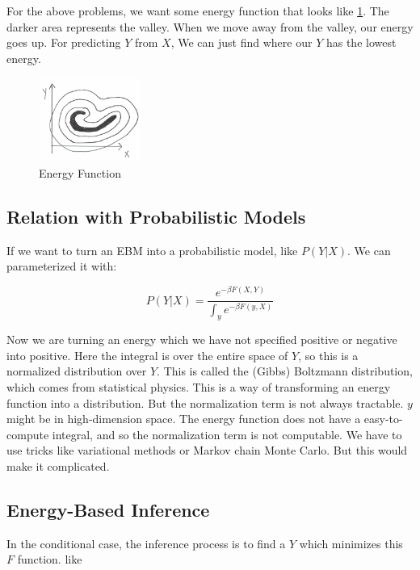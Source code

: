 For the above problems, we want some energy function that looks like \cref{fig:energyfunction}. 
The darker area represents the valley. When we move away from the valley, our energy goes up. 
For predicting $Y$ from $X$, We can just find where our $Y$ has the lowest energy.

\begin{figure}[htb]
  \centering
    \includegraphics[width=0.3\textwidth]{figs/EBM5.png}
    \caption{Energy Function}
    \label{fig:energyfunction}
\end{figure}

\subsection{Relation with Probabilistic Models}
If we want to turn an EBM into a probabilistic model, like $P(Y|X)$. We can parameterized it with:


\begin{equation*}
    P(Y|X) = \frac{e^{-\beta F(X,Y)}}{\int_y e^{-\beta F(y,X)}}
\end{equation*}

Now we are turning an energy which we have not specified positive or negative into positive. 
Here the integral is over the entire space of $Y$, so this is a normalized distribution over $Y$. 
This is called the (Gibbs) Boltzmann distribution, which comes from statistical physics. 
This is a way of transforming an energy function into a distribution. 
But the normalization term is not always tractable. 
$y$ might be in high-dimension space. 
The energy function does not have a easy-to-compute integral, and so the normalization term is not computable. We have to use tricks like variational methods or Markov chain Monte Carlo. But this would make it complicated.

\subsection{Energy-Based Inference}
In the conditional case, the inference process is to find a $Y$ which minimizes this $F$ function. like

